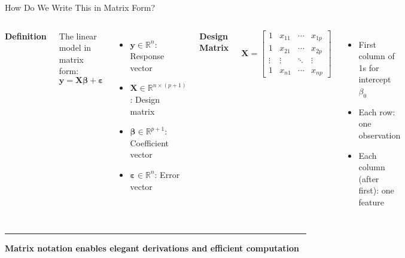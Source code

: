 \documentclass[8pt,aspectratio=169]{beamer}
\newcommand{\bottomnote}[1]{%
\vfill
\vspace{-2mm}
\textcolor{mllavender2}{\rule{\textwidth}{0.4pt}}
\vspace{1mm}
\footnotesize
\textbf{#1}
}
\begin{document}
\begin{frame}[t]{How Do We Write This in Matrix Form?}
\begin{columns}[T]
\textbf{Definition}

The linear model in matrix form:
\begin{equation}
  \mathbf{y} = \mathbf{X}\boldsymbol{\beta} + \boldsymbol{\varepsilon}
\end{equation}

\begin{itemize}
  \item $\mathbf{y} \in \mathbb{R}^n$: Response vector
  \item $\mathbf{X} \in \mathbb{R}^{n \times (p+1)}$: Design matrix
  \item $\boldsymbol{\beta} \in \mathbb{R}^{p+1}$: Coefficient vector
  \item $\boldsymbol{\varepsilon} \in \mathbb{R}^n$: Error vector
\end{itemize}

\textbf{Design Matrix}

\begin{equation}
  \mathbf{X} = \begin{bmatrix}
    1 & x_{11} & \cdots & x_{1p} \\
    1 & x_{21} & \cdots & x_{2p} \\
    \vdots & \vdots & \ddots & \vdots \\
    1 & x_{n1} & \cdots & x_{np}
  \end{bmatrix}
\end{equation}

\begin{itemize}
  \item First column of 1s for intercept $\beta_0$
  \item Each row: one observation
  \item Each column (after first): one feature
\end{itemize}
\end{columns}

\bottomnote{Matrix notation enables elegant derivations and efficient computation}
\end{frame}
\end{document}
